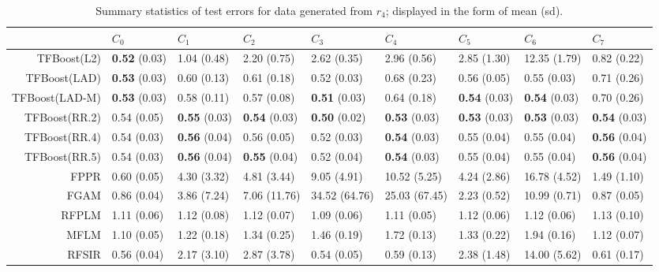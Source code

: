 \begin{table}[H]
\centering
\begin{tabular}{rllllllll}
  \hline
 & $C_0$ & $C_1$ & $C_2$ & $C_3$ & $C_4$ & $C_5$ & $C_6$ & $C_7$ \\ 
  \hline
TFBoost(L2) & \textbf{0.52} (0.03) & 1.04 (0.48) & 2.20 (0.75) & 2.62 (0.35) & 2.96 (0.56) & 2.85 (1.30) & 12.35 (1.79) & 0.82 (0.22) \\ 
  TFBoost(LAD) & \textbf{0.53} (0.03) & 0.60 (0.13) & 0.61 (0.18) & 0.52 (0.03) & 0.68 (0.23) & 0.56 (0.05) & 0.55 (0.03) & 0.71 (0.26) \\ 
  TFBoost(LAD-M) & \textbf{0.53} (0.03) & 0.58 (0.11) & 0.57 (0.08) & \textbf{0.51} (0.03) & 0.64 (0.18) & \textbf{0.54} (0.03) & \textbf{0.54} (0.03) & 0.70 (0.26) \\ 
  TFBoost(RR.2) & 0.54 (0.05) & \textbf{0.55} (0.03) & \textbf{0.54} (0.03) & \textbf{0.50} (0.02) & \textbf{0.53} (0.03) & \textbf{0.53} (0.03) & \textbf{0.53} (0.03) & \textbf{0.54} (0.03) \\ 
  TFBoost(RR.4) & 0.54 (0.03) & \textbf{0.56} (0.04) & 0.56 (0.05) & 0.52 (0.03) & \textbf{0.54} (0.03) & 0.55 (0.04) & 0.55 (0.04) & \textbf{0.56} (0.04) \\ 
  TFBoost(RR.5) & 0.54 (0.03) & \textbf{0.56} (0.04) & \textbf{0.55} (0.04) & 0.52 (0.04) & \textbf{0.54} (0.03) & 0.55 (0.04) & 0.55 (0.04) & \textbf{0.56} (0.04) \\ 
  FPPR & 0.60 (0.05) & 4.30 (3.32) & 4.81 (3.44) & 9.05 (4.91) & 10.52 (5.25) & 4.24 (2.86) & 16.78 (4.52) & 1.49 (1.10) \\ 
  FGAM & 0.86 (0.04) & 3.86 (7.24) & 7.06 (11.76) & 34.52 (64.76) & 25.03 (67.45) & 2.23 (0.52) & 10.99 (0.71) & 0.87 (0.05) \\ 
  RFPLM & 1.11 (0.06) & 1.12 (0.08) & 1.12 (0.07) & 1.09 (0.06) & 1.11 (0.05) & 1.12 (0.06) & 1.12 (0.06) & 1.13 (0.10) \\ 
  MFLM & 1.10 (0.05) & 1.22 (0.18) & 1.34 (0.25) & 1.46 (0.19) & 1.72 (0.13) & 1.33 (0.22) & 1.94 (0.16) & 1.12 (0.07) \\ 
  RFSIR & 0.56 (0.04) & 2.17 (3.10) & 2.87 (3.78) & 0.54 (0.05) & 0.59 (0.13) & 2.38 (1.48) & 14.00 (5.62) & 0.61 (0.17) \\ 
   \hline
\end{tabular}
\caption{Summary statistics of test errors for data generated from $r_4$; displayed in the form of mean (sd).} 
\end{table}
